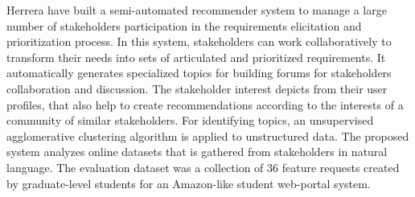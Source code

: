 Herrera \etal \cite{Castro-Herrera:2009} have built a semi-automated recommender system to manage a large number of stakeholders participation in
the requirements elicitation and prioritization process. In this system, stakeholders can work collaboratively to transform their needs into sets
of articulated and prioritized requirements. It automatically
generates specialized topics for building forums for stakeholders collaboration and discussion.  The stakeholder interest depicts from their user profiles, that also help to create recommendations according to the
interests of a community of similar stakeholders. For identifying topics, an unsupervised agglomerative clustering algorithm is
applied to unstructured data. The proposed system analyzes online
datasets that is gathered from stakeholders in natural language. 
The evaluation  dataset was a collection of 36 feature requests created by
graduate-level students for an Amazon-like student web-portal system.




